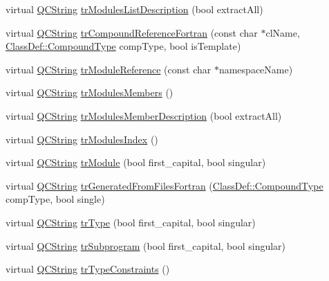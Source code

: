 \begin{DoxyCompactItemize}
\item 
virtual \hyperlink{class_q_c_string}{Q\-C\-String} \hyperlink{class_translator_italian_a4f1ad06ac7478b9058d7f388a2b67566}{tr\-Modules\-List\-Description} (bool extract\-All)
\item 
virtual \hyperlink{class_q_c_string}{Q\-C\-String} \hyperlink{class_translator_italian_a79d39414275f1cacb484f78806a65869}{tr\-Compound\-Reference\-Fortran} (const char $\ast$cl\-Name, \hyperlink{class_class_def_a768a6f0a6fd7e9087ff7971abbcc3f36}{Class\-Def\-::\-Compound\-Type} comp\-Type, bool is\-Template)
\item 
virtual \hyperlink{class_q_c_string}{Q\-C\-String} \hyperlink{class_translator_italian_a5b0385db8ce8e7c8251e31867c6fa8d5}{tr\-Module\-Reference} (const char $\ast$namespace\-Name)
\item 
virtual \hyperlink{class_q_c_string}{Q\-C\-String} \hyperlink{class_translator_italian_a75279d9914e0cc54ee5f4b15ddaa234c}{tr\-Modules\-Members} ()
\item 
virtual \hyperlink{class_q_c_string}{Q\-C\-String} \hyperlink{class_translator_italian_a26dd0f47c7f59841f901da7f4bd19306}{tr\-Modules\-Member\-Description} (bool extract\-All)
\item 
virtual \hyperlink{class_q_c_string}{Q\-C\-String} \hyperlink{class_translator_italian_a8a71cbe9e0669d3555731c3ebc0aae35}{tr\-Modules\-Index} ()
\item 
virtual \hyperlink{class_q_c_string}{Q\-C\-String} \hyperlink{class_translator_italian_a894e0b632e1680e918c78fea5b9b5384}{tr\-Module} (bool first\-\_\-capital, bool singular)
\item 
virtual \hyperlink{class_q_c_string}{Q\-C\-String} \hyperlink{class_translator_italian_ab89226b80b72b0ff8f4fca99626097ba}{tr\-Generated\-From\-Files\-Fortran} (\hyperlink{class_class_def_a768a6f0a6fd7e9087ff7971abbcc3f36}{Class\-Def\-::\-Compound\-Type} comp\-Type, bool single)
\item 
virtual \hyperlink{class_q_c_string}{Q\-C\-String} \hyperlink{class_translator_italian_a2763a6af55d1ca03be54604c2bc4a3b4}{tr\-Type} (bool first\-\_\-capital, bool singular)
\item 
virtual \hyperlink{class_q_c_string}{Q\-C\-String} \hyperlink{class_translator_italian_aeceda8d8c2b8645fd2337cb38d293269}{tr\-Subprogram} (bool first\-\_\-capital, bool singular)
\item 
virtual \hyperlink{class_q_c_string}{Q\-C\-String} \hyperlink{class_translator_italian_a196f3eb690f2748ee71f518cf02bd7fe}{tr\-Type\-Constraints} ()

\end{DoxyCompactItemize}
